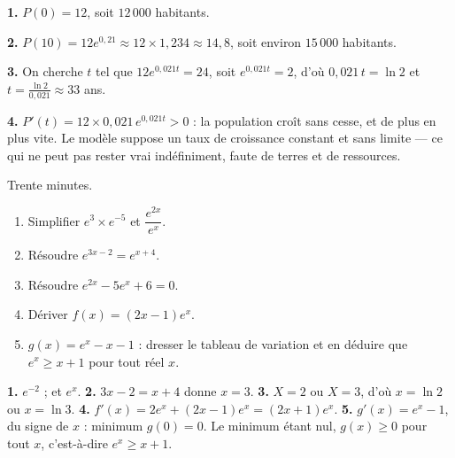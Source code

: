 \begin{corrige}
\textbf{1.} $P(0) = 12$, soit $12\,000$ habitants.

\textbf{2.} $P(10) = 12e^{0{,}21} \approx 12\times1{,}234 \approx 14{,}8$,
soit environ $15\,000$ habitants.

\textbf{3.} On cherche $t$ tel que $12e^{0{,}021t} = 24$, soit
$e^{0{,}021t} = 2$, d'où $0{,}021\,t = \ln2$ et
$t = \frac{\ln2}{0{,}021} \approx 33$ ans.

\textbf{4.} $P'(t) = 12\times0{,}021\,e^{0{,}021t} > 0$ : la population
croît sans cesse, et de plus en plus vite. Le modèle suppose un taux de
croissance constant et sans limite — ce qui ne peut pas rester vrai
indéfiniment, faute de terres et de ressources.
\end{corrige}

\begin{jemeteste}
Trente minutes.

\begin{enumerate}[label=\textbf{\arabic*.}, leftmargin=*, itemsep=0.3em]
  \item Simplifier $e^{3}\times e^{-5}$ et $\dfrac{e^{2x}}{e^{x}}$.
  \item Résoudre $e^{3x-2} = e^{x+4}$.
  \item Résoudre $e^{2x}-5e^{x}+6 = 0$.
  \item Dériver $f(x) = (2x-1)e^{x}$.
  \item $g(x) = e^{x}-x-1$ : dresser le tableau de variation et en déduire
        que $e^{x} \geq x+1$ pour tout réel $x$.
\end{enumerate}
\end{jemeteste}

\begin{corrige}[je me teste]
\textbf{1.} $e^{-2}$ ; et $e^{x}$.
\textbf{2.} $3x-2 = x+4$ donne $x = 3$.
\textbf{3.} $X = 2$ ou $X = 3$, d'où $x = \ln2$ ou $x = \ln3$.
\textbf{4.} $f'(x) = 2e^{x}+(2x-1)e^{x} = (2x+1)e^{x}$.
\textbf{5.} $g'(x) = e^{x}-1$, du signe de $x$ : minimum $g(0) = 0$. Le
minimum étant nul, $g(x) \geq 0$ pour tout $x$, c'est-à-dire
$e^{x} \geq x+1$.
\end{corrige}

